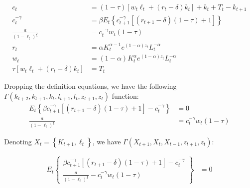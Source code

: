 \documentclass[11pt]{article}
\numberwithin{equation}{section}
\theoremstyle{plain}
\theoremstyle{definition}
\newcommand\braces[1]{\left\{ #1 \right\}}
\newcommand{\1}{\mathbbm 1}
\def\a{\alpha}
\def\g{\gamma}
\begin{document}
\begin{align}
c_{t}&=(1-\tau)\left[w_{t} \ell_{t}+\left(r_{t}-\delta\right) k_{t}\right]+k_{t}+T_{t}-k_{t+1} \\
c_t^{-\g}&=\beta E_{t}\left\{c_{t+1}^{-\g}\left[\left(r_{t+1}-\delta\right)(1-\tau)+1\right]\right\} \\
\frac{a}{(1-\ell_t)^{\xi}}&=c_t^{-\g} w_{t}(1-\tau) \\
r_{t}&=\a K_{t}^{\alpha - 1} e^{(1-\alpha)z_{t}}L_t^{-\a}\\
w_{t}&=(1-\a)K_{t}^{\alpha} e^{(1- \alpha) z_{t}}L_t^{-\a} \\
\tau\left[w_{t} \ell_{t}+\left(r_{t}-\delta\right) k_{t}\right]&=T_t
\end{align}



Dropping the definition equations, we have the following $\Gamma (k_{t+2},k_{t+1},k_t,l_{t+1},l_t, z_{t+1},z_{t})$ function:
\begin{align}
E_{t}\left\{ \beta c_{t+1}^{-\g}\left[\left(r_{t+1}-\delta\right)(1-\tau)+1\right] - c_t^{-\g} \right\} &=0 \\
\frac{a}{(1-\ell_t)^{\xi}}&=c_t^{-\g} w_{t}(1-\tau)
\end{align}

Denoting $X_t = \braces{K_{t+1},\ell_{t}}$, we have $\Gamma (X_{t+1},X_t,X_{t-1},z_{t+1},z_{t})$:

\begin{align}
E_{t} \braces{\begin{array}{ll}
               \beta c_{t+1}^{-\g}\left[\left(r_{t+1}-\delta\right)(1-\tau)+1\right] - c_t^{-\g}  \\
               \frac{a}{(1-\ell_t)^{\xi}} - c_t^{-\g} w_{t}(1-\tau)      \end{array}} &= 0
\end{align}
\end{document}
